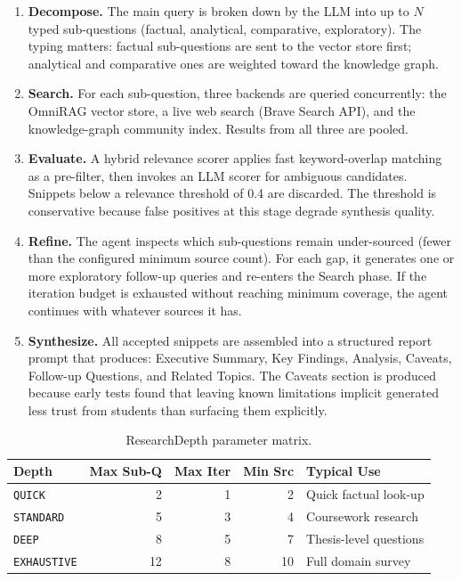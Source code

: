\begin{enumerate}
    \item \textbf{Decompose.} The main query is broken down by the LLM into
    up to $N$ typed sub-questions (factual, analytical, comparative, exploratory).
    The typing matters: factual sub-questions are sent to the vector store first;
    analytical and comparative ones are weighted toward the knowledge graph.

    \item \textbf{Search.} For each sub-question, three backends are queried
    concurrently: the OmniRAG vector store, a live web search (Brave Search API),
    and the knowledge-graph community index. Results from all three are pooled.

    \item \textbf{Evaluate.} A hybrid relevance scorer applies fast keyword-overlap
    matching as a pre-filter, then invokes an LLM scorer for ambiguous candidates.
    Snippets below a relevance threshold of 0.4 are discarded. The threshold is
    conservative because false positives at this stage degrade synthesis quality.

    \item \textbf{Refine.} The agent inspects which sub-questions remain
    under-sourced (fewer than the configured minimum source count). For each gap,
    it generates one or more exploratory follow-up queries and re-enters the
    Search phase. If the iteration budget is exhausted without reaching minimum
    coverage, the agent continues with whatever sources it has.

    \item \textbf{Synthesize.} All accepted snippets are assembled into a structured
    report prompt that produces: Executive Summary, Key Findings, Analysis,
    Caveats, Follow-up Questions, and Related Topics. The Caveats section is
    produced because early tests found that leaving known limitations implicit
    generated less trust from students than surfacing them explicitly.
\end{enumerate}

\begin{table}[ht]
    \centering
    \caption{ResearchDepth parameter matrix.}
    \label{tab:depth}
    \begin{tabular}{lrrrl}
        \toprule
        \textbf{Depth} & \textbf{Max Sub-Q} & \textbf{Max Iter} &
        \textbf{Min Src} & \textbf{Typical Use} \\
        \midrule
        \texttt{QUICK}      & 2  & 1 & 2  & Quick factual look-up \\
        \texttt{STANDARD}   & 5  & 3 & 4  & Coursework research \\
        \texttt{DEEP}       & 8  & 5 & 7  & Thesis-level questions \\
        \texttt{EXHAUSTIVE} & 12 & 8 & 10 & Full domain survey \\
        \bottomrule
    \end{tabular}
\end{table}

